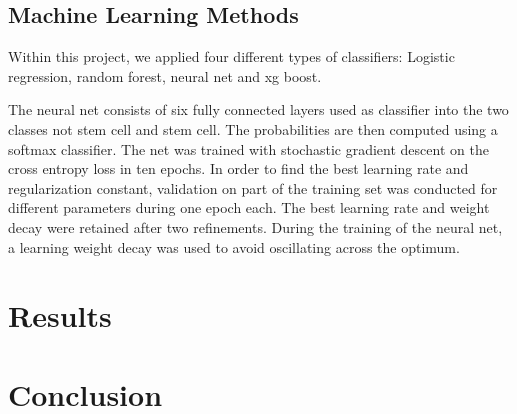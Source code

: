 \documentclass[10pt,conference,compsocconf]{IEEEtran}
\begin{document}
\subsection{Machine Learning Methods}
Within this project, we applied four different types of classifiers: Logistic regression, random forest, neural net and xg boost.
\par

The neural net consists of six fully connected layers used as classifier into the two classes not stem cell and stem cell. The probabilities are then computed using a softmax classifier. The net was trained with stochastic gradient descent on the cross entropy loss in ten epochs. In order to find the best learning rate and regularization constant, validation on part of the training set was conducted for different parameters during one epoch each. The best learning rate and weight decay were retained after two refinements. During the training of the neural net, a learning weight decay was used to avoid oscillating across the optimum.


\section*{Results}

\section*{Conclusion}



\end{document}
